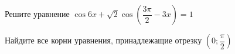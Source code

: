 \begin{ex}
	\begin{condition}
		\begin{enumcols}[label=\asbuk*)]
			\item Решите уравнение \( \cos 6x+\sqrt{2}\cos{\left(\dfrac{3\pi}{2}-3x\right)}= 1 \)
			\item Найдите все корни уравнения, принадлежащие отрезку \( \left(0;\dfrac{\pi}{2}\right) \)
		\end{enumcols}
	\end{condition}
\end{ex}